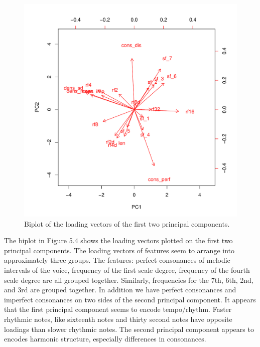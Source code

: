 \documentclass[12pt,twoside]{reedthesis}
\theoremstyle{definition}
\theoremstyle{definition}
\theoremstyle{definition}
\theoremstyle{remark}
\begin{document}
\begin{figure}[H]
\centering
\includegraphics[scale = .7]{images/biplot_b.pdf}
\caption{Biplot of the loading vectors of the first two principal components.}
\label{subd}
\end{figure}
The biplot in Figure 5.4 shows the loading vectors plotted on the first
two principal components. The loading vectors of features seem to
arrange into approximately three groups. The features: perfect
consonances of melodic intervals of the voice, frequency of the first
scale degree, frequency of the fourth scale degree are all grouped
together. Similarly, frequencies for the 7th, 6th, 2nd, and 3rd are
grouped together. In addition we have perfect consonances and imperfect
consonances on two sides of the second principal component. It appears
that the first principal component seems to encode tempo/rhythm. Faster
rhythmic notes, like sixteenth notes and thirty second notes have
opposite loadings than slower rhythmic notes. The second principal
component appears to encodes harmonic structure, especially differences
in consonances.
\end{document}
